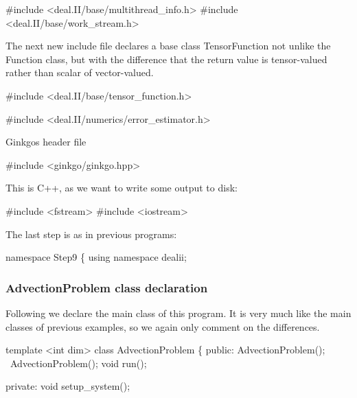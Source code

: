 \begin{DoxyCode}
\textcolor{preprocessor}{#include <deal.II/base/multithread\_info.h>}
\textcolor{preprocessor}{#include <deal.II/base/work\_stream.h>}
\end{DoxyCode}


The next new include file declares a base class {\ttfamily Tensor\+Function} not unlike the {\ttfamily Function} class, but with the difference that the return value is tensor-\/valued rather than scalar of vector-\/valued.


\begin{DoxyCode}
\textcolor{preprocessor}{#include <deal.II/base/tensor\_function.h>}

\textcolor{preprocessor}{#include <deal.II/numerics/error\_estimator.h>}
\end{DoxyCode}


Ginkgo\textquotesingle{}s header file


\begin{DoxyCode}
\textcolor{preprocessor}{#include <ginkgo/ginkgo.hpp>}
\end{DoxyCode}


This is C++, as we want to write some output to disk\+:


\begin{DoxyCode}
\textcolor{preprocessor}{#include <fstream>}
\textcolor{preprocessor}{#include <iostream>}
\end{DoxyCode}


The last step is as in previous programs\+:


\begin{DoxyCode}
\textcolor{keyword}{namespace }Step9 \{
\textcolor{keyword}{using namespace }dealii;
\end{DoxyCode}


\label{_AdvectionProblemclassdeclaration}%
 \subsubsection*{Advection\+Problem class declaration}

Following we declare the main class of this program. It is very much like the main classes of previous examples, so we again only comment on the differences.


\begin{DoxyCode}
\textcolor{keyword}{template} <\textcolor{keywordtype}{int} dim>
\textcolor{keyword}{class }AdvectionProblem \{
\textcolor{keyword}{public}:
    AdvectionProblem();
    ~AdvectionProblem();
    \textcolor{keywordtype}{void} run();

\textcolor{keyword}{private}:
    \textcolor{keywordtype}{void} setup\_system();
\end{DoxyCode}


